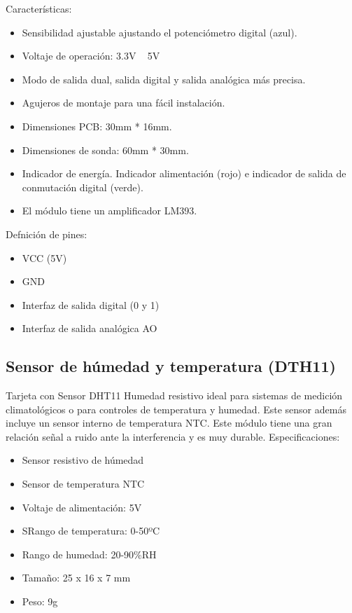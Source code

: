 \documentclass{article}
\begin{document}
Características:

\begin{itemize}
	\item Sensibilidad ajustable ajustando el potenciómetro digital (azul).
	\item Voltaje de operación: 3.3V ~ 5V
	\item Modo de salida dual, salida digital y salida analógica más precisa.
	\item Agujeros de montaje para una fácil instalación.
	\item Dimensiones PCB: 30mm * 16mm.
	\item Dimensiones de sonda: 60mm * 30mm.
	\item Indicador de energía. Indicador alimentación (rojo) e indicador de salida de conmutación digital (verde).
	\item El módulo tiene un amplificador LM393.
\end{itemize}

Defnición de pines:

\begin{itemize}
	\item VCC (5V)
	\item GND
	\item Interfaz de salida digital (0 y 1) 
	\item Interfaz de salida analógica AO
\end{itemize}

\subsection{Sensor de húmedad  y temperatura (DTH11)}
Tarjeta con Sensor DHT11 Humedad resistivo ideal para sistemas de medición climatológicos o para controles de temperatura y humedad. Este sensor además incluye un sensor interno de temperatura NTC. Este módulo tiene una gran relación señal a ruido ante la interferencia y es muy durable.
Especificaciones:

\begin{itemize}
	\item Sensor resistivo de húmedad
	\item Sensor de temperatura NTC
	\item Voltaje de alimentación: 5V
	\item SRango de temperatura: 0-50ºC
	\item Rango de humedad: 20-90{\%}RH
	\item Tamaño: 25 x 16 x 7 mm
	\item Peso: 9g
\end{itemize}
\end{document}
